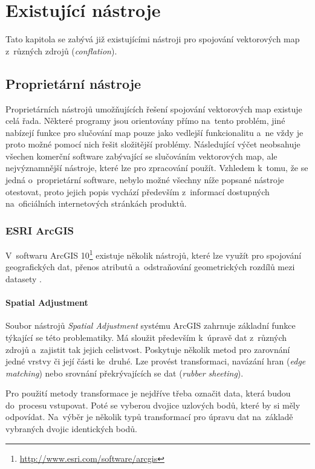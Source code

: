 \chapter{Existující nástroje}
\label{3-nastroje}

Tato kapitola se zabývá již existujícími nástroji pro spojování vektorových map
 z~různých zdrojů (\textit{conflation}).


\section{Proprietární nástroje}
\label{proprietární}

Proprietárních nástrojů umožňujících řešení spojování vektorových map 
existuje celá řada. Některé programy jsou orientovány přímo na~tento problém,
jiné nabízejí funkce pro slučování map pouze jako vedlejší funkcionalitu 
a~ne vždy je proto možné pomocí nich řešit složitější problémy. Následující
výčet neobsahuje všechen komerční software zabývající se slučováním
vektorových map, ale nejvýznamnější nástroje, které lze pro zpracování 
použít. Vzhledem k~tomu, že se jedná o~proprietární software, nebylo možné 
všechny níže popsané nástroje otestovat, proto jejich popis vychází 
především z~informací dostupných na~oficiálních internetových stránkách 
produktů.


\subsection{ESRI ArcGIS}
\label{arcgis}

V~softwaru ArcGIS 10\footnote{\url{http://www.esri.com/software/arcgis}} 
existuje několik nástrojů, které lze využít pro spojování
geo\-grafických dat, přenos atributů a~odstraňování geometrických rozdílů 
mezi datasety \cite{arcgishelp}. 

\subsubsection{Spatial Adjustment}

Soubor nástrojů \textit{Spatial Adjustment} systému ArcGIS zahrnuje 
základní funkce týkající se této problematiky. Má sloužit především 
k~úpravě dat z~různých zdrojů a~zajistit tak jejich celistvost. 
Poskytuje několik metod pro zarovnání jedné vrstvy či její části 
ke~druhé. Lze provést transformaci, navázání hran (\textit{edge matching})
nebo srovnání překrývajících se dat (\textit{rubber sheeting}).

Pro použití metody transformace je nejdříve třeba označit data, která budou
do~procesu vstupovat. Poté se vyberou dvojice uzlových bodů, které by si měly
odpovídat. Na~výběr je několik typů transformací pro úpravu dat
na~zá\-kladě vybraných dvojic identických bodů. 

